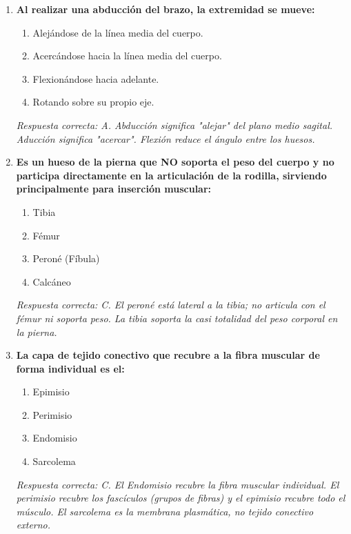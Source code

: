 \begin{enumerate}[label=\textbf{\arabic*.}]
    \item \textbf{Al realizar una abducción del brazo, la extremidad se mueve:}
    \begin{enumerate}
        \item[A)] Alejándose de la línea media del cuerpo.
        \item[B)] Acercándose hacia la línea media del cuerpo.
        \item[C)] Flexionándose hacia adelante.
        \item[D)] Rotando sobre su propio eje.
    \end{enumerate}
    \textit{Respuesta correcta: A. Abducción significa "alejar" del plano medio sagital. Aducción significa "acercar". Flexión reduce el ángulo entre los huesos.}

    \item \textbf{Es un hueso de la pierna que NO soporta el peso del cuerpo y no participa directamente en la articulación de la rodilla, sirviendo principalmente para inserción muscular:}
    \begin{enumerate}
        \item[A)] Tibia
        \item[B)] Fémur
        \item[C)] Peroné (Fíbula)
        \item[D)] Calcáneo
    \end{enumerate}
    \textit{Respuesta correcta: C. El peroné está lateral a la tibia; no articula con el fémur ni soporta peso. La tibia soporta la casi totalidad del peso corporal en la pierna.}

    \item \textbf{La capa de tejido conectivo que recubre a la fibra muscular de forma individual es el:}
    \begin{enumerate}
        \item[A)] Epimisio
        \item[B)] Perimisio
        \item[C)] Endomisio
        \item[D)] Sarcolema
    \end{enumerate}
    \textit{Respuesta correcta: C. El Endomisio recubre la fibra muscular individual. El perimisio recubre los fascículos (grupos de fibras) y el epimisio recubre todo el músculo. El sarcolema es la membrana plasmática, no tejido conectivo externo.}

\end{enumerate}


